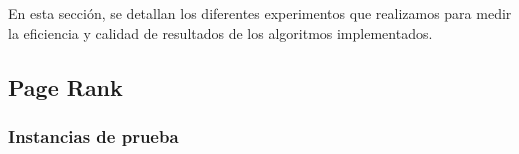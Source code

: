 \newcommand{\imagenB}[2]{%
\texttt{[image: \#2]}
\endgroup}

\def\imagen{\begingroup
\catcode`\_=12
\imagenB}

En esta sección, se detallan los diferentes experimentos que realizamos para medir la eficiencia y calidad de resultados de los algoritmos implementados.

\subsection{Page Rank}

\subsubsection{Instancias de prueba}

